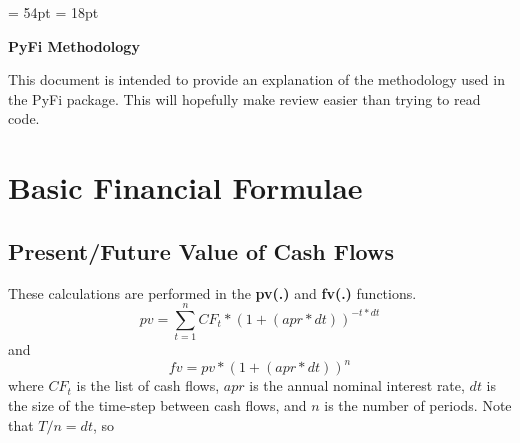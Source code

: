 \documentclass[10pt]{article}
\begin{document}
\evensidemargin = 54pt
\topmargin = 18pt
\begin{center}
    {\bfseries\Huge PyFi Methodology}\\
\end{center}

\begin{flushleft}
    This document is intended to provide an explanation of the methodology used in the PyFi package.
    This will hopefully make review easier than trying to read code.
\end{flushleft}

\section{Basic Financial Formulae}
\subsection*{Present/Future Value of Cash Flows}
These calculations are performed in the \textbf{pv(.)} and \textbf{fv(.)} functions.\\
    \begin{equation}
        pv = \sum_{t=1}^n CF_t * (1 + (apr*dt))^{-t*dt}
    \end{equation}
and\\
    \begin{equation}
        fv = pv*(1 + (apr*dt))^{n}
    \end{equation}
where $CF_t$ is the list of cash flows, $apr$ is the annual nominal interest rate, 
$dt$ is the size of the time-step between cash flows, and $n$ is the number of periods. Note that 
$T/n = dt$, so
\end{document}
